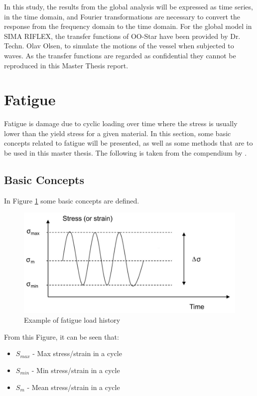 \noindent In this study, the results from the global analysis will be expressed as time series, in the time domain, and Fourier transformations are necessary to convert the response from the frequency domain to the time domain. \newline
\newline 
\noindent For the global model in SIMA RIFLEX, the transfer functions of OO-Star have been provided by Dr. Techn. Olav Olsen, to simulate the motions of the vessel when subjected to waves. As the transfer functions are regarded as confidential they cannot be reproduced in this Master Thesis report.   

\section{Fatigue}
Fatigue is damage due to cyclic loading over time where the stress is usually lower than the yield stress for a given material. In this section, some basic concepts related to fatigue will be presented, as well as some methods that are to be used in this master thesis. The following is taken from the compendium by \cite{fatigue2016}. \newline
\newline
\subsection{Basic Concepts}
In Figure \ref{fig:fatigue} some basic concepts are defined. 

\begin{figure}[h!]
\centering
\includegraphics[scale=0.6]{figures/cycle}
\caption[$\; \:$Example of fatigue load history]{Example of fatigue load history  \cite{fatigue2016} }
 \label{fig:fatigue}
\end{figure}

From this Figure, it can be seen that:
\begin{itemize}
    \item $S_{max}$ -  Max stress/strain in a cycle
    \item $S_{min}$ -  Min stress/strain in a cycle
    \item $S_{m}$ - Mean stress/strain in a cycle
\end{itemize}

